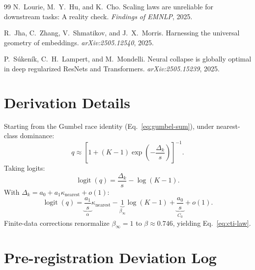 \documentclass{article}
\DeclareMathOperator{\logit}{logit}
\begin{document}
\begin{thebibliography}{99}
N.~Lourie, M.~Y.~Hu, and K.~Cho.
\newblock Scaling laws are unreliable for downstream tasks: A reality check.
\newblock \emph{Findings of EMNLP}, 2025.

R.~Jha, C.~Zhang, V.~Shmatikov, and J.~X.~Morris.
\newblock Harnessing the universal geometry of embeddings.
\newblock \emph{arXiv:2505.12540}, 2025.

P.~S\'{u}ken\'{i}k, C.~H.~Lampert, and M.~Mondelli.
\newblock Neural collapse is globally optimal in deep regularized {ResNets} and {Transformers}.
\newblock \emph{arXiv:2505.15239}, 2025.

\end{thebibliography}

\appendix
\section{Derivation Details}
Starting from the Gumbel race identity (Eq.~\ref{eq:gumbel-sum}), under nearest-class dominance:
\[
q\approx\left[1+(K-1)\exp\!\left(-\frac{\Delta_k}{s}\right)\right]^{-1}.
\]
Taking logits:
\[
\logit(q)=\frac{\Delta_k}{s}-\log(K-1).
\]
With $\Delta_k=a_0+a_1\kappa_{\mathrm{nearest}}+o(1)$:
\[
\logit(q)=\underbrace{\frac{a_1}{s}}_{\alpha}\kappa_{\mathrm{nearest}}
-\underbrace{1}_{\beta_\infty}\log(K-1)
+\underbrace{\frac{a_0}{s}}_{C_0}+o(1).
\]
Finite-data corrections renormalize $\beta_\infty=1$ to $\beta\approx0.746$, yielding Eq.~\ref{eq:cti-law}.

\section{Pre-registration Deviation Log}
\label{app:prereg-deviations}
\end{document}
